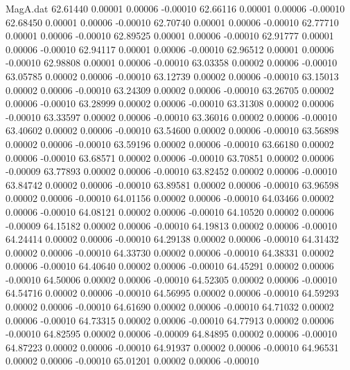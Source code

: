 \begin{filecontents}{MagA.dat}
  62.61440    0.00001    0.00006   -0.00010
  62.66116    0.00001    0.00006   -0.00010
  62.68450    0.00001    0.00006   -0.00010
  62.70740    0.00001    0.00006   -0.00010
  62.77710    0.00001    0.00006   -0.00010
  62.89525    0.00001    0.00006   -0.00010
  62.91777    0.00001    0.00006   -0.00010
  62.94117    0.00001    0.00006   -0.00010
  62.96512    0.00001    0.00006   -0.00010
  62.98808    0.00001    0.00006   -0.00010
  63.03358    0.00002    0.00006   -0.00010
  63.05785    0.00002    0.00006   -0.00010
  63.12739    0.00002    0.00006   -0.00010
  63.15013    0.00002    0.00006   -0.00010
  63.24309    0.00002    0.00006   -0.00010
  63.26705    0.00002    0.00006   -0.00010
  63.28999    0.00002    0.00006   -0.00010
  63.31308    0.00002    0.00006   -0.00010
  63.33597    0.00002    0.00006   -0.00010
  63.36016    0.00002    0.00006   -0.00010
  63.40602    0.00002    0.00006   -0.00010
  63.54600    0.00002    0.00006   -0.00010
  63.56898    0.00002    0.00006   -0.00010
  63.59196    0.00002    0.00006   -0.00010
  63.66180    0.00002    0.00006   -0.00010
  63.68571    0.00002    0.00006   -0.00010
  63.70851    0.00002    0.00006   -0.00009
  63.77893    0.00002    0.00006   -0.00010
  63.82452    0.00002    0.00006   -0.00010
  63.84742    0.00002    0.00006   -0.00010
  63.89581    0.00002    0.00006   -0.00010
  63.96598    0.00002    0.00006   -0.00010
  64.01156    0.00002    0.00006   -0.00010
  64.03466    0.00002    0.00006   -0.00010
  64.08121    0.00002    0.00006   -0.00010
  64.10520    0.00002    0.00006   -0.00009
  64.15182    0.00002    0.00006   -0.00010
  64.19813    0.00002    0.00006   -0.00010
  64.24414    0.00002    0.00006   -0.00010
  64.29138    0.00002    0.00006   -0.00010
  64.31432    0.00002    0.00006   -0.00010
  64.33730    0.00002    0.00006   -0.00010
  64.38331    0.00002    0.00006   -0.00010
  64.40640    0.00002    0.00006   -0.00010
  64.45291    0.00002    0.00006   -0.00010
  64.50006    0.00002    0.00006   -0.00010
  64.52305    0.00002    0.00006   -0.00010
  64.54716    0.00002    0.00006   -0.00010
  64.56995    0.00002    0.00006   -0.00010
  64.59293    0.00002    0.00006   -0.00010
  64.61690    0.00002    0.00006   -0.00010
  64.71032    0.00002    0.00006   -0.00010
  64.73315    0.00002    0.00006   -0.00010
  64.77913    0.00002    0.00006   -0.00010
  64.82595    0.00002    0.00006   -0.00009
  64.84895    0.00002    0.00006   -0.00010
  64.87223    0.00002    0.00006   -0.00010
  64.91937    0.00002    0.00006   -0.00010
  64.96531    0.00002    0.00006   -0.00010
  65.01201    0.00002    0.00006   -0.00010

\end{filecontents}
